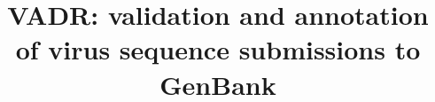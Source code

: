 \documentclass[twocolumn]{bmcart}%
\begin{document}
\begin{frontmatter}

\begin{fmbox}


\title{VADR: validation and annotation of virus sequence submissions to GenBank}


\author[
   addressref={aff1,aff2},
   email={alejandro.schaffer@nih.gov}
]{ }
\author[
   addressref={aff2},
   email={hatchere@ncbi.nlm.nih.gov}
]{ }
\author[
   addressref={aff2},
   email={yankie@ncbi.nlm.nih.gov}
]{ }
\author[
   addressref={aff2,aff3},
   email={larashonkwiler@gmail.com}
]{ }
\author[
   addressref={aff2},
   email={jamesbr@ncbi.nlm.nih.gov}
]{ }
\author[
   addressref={aff2},
   email={mizrachi@ncbi.nlm.nih.gov}
]{ }
\author[
   addressref={aff2},                   %
   corref={aff2},                       %
   email={nawrocke@ncbi.nlm.nih.gov}   %
]{ }



\end{fmbox}
\end{frontmatter}
\end{document}
